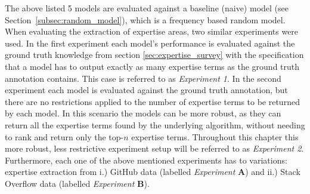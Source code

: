         The above listed 5 models are evaluated against a baseline (naive) model (see Section~\ref{subsec:random_model}), which is a frequency based random model. When evaluating the extraction of expertise areas, two similar experiments were used. In the first experiment each model's performance is evaluated against the ground truth knowledge from section \ref{sec:expertise_survey} with the specification that a model has to output exactly as many expertise terms as the ground truth annotation contains. This case is referred to as \emph{Experiment 1}. In the second experiment each model is evaluated against the ground truth annotation, but there are no restrictions applied to the number of expertise terms to be returned by each model. In this scenario the models can be more robust, as they can return all the expertise terms found by the underlying algorithm, without needing to rank and return only the top-$n$ expertise terms. Throughout this chapter this more robust, less restrictive experiment setup will be referred to as \emph{Experiment 2}. Furthermore, each one of the above mentioned experiments has to variations: expertise extraction from i.) GitHub data (labelled \emph{Experiment} \textbf{A}) and ii.) Stack Overflow data (labelled \emph{Experiment} \textbf{B}).
        
